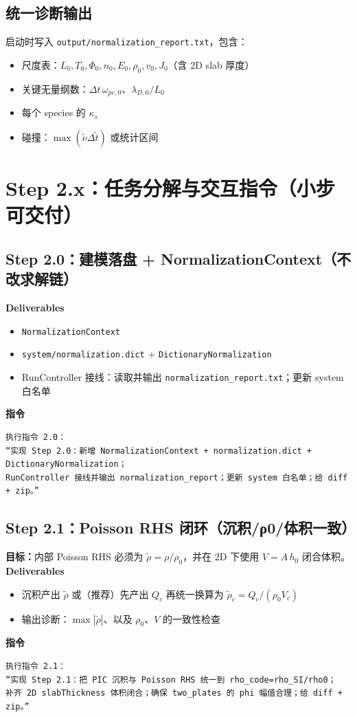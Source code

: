 \documentclass[11pt,a4paper]{ctexart}
\begin{document}
\subsection{统一诊断输出}
启动时写入 \texttt{output/normalization\_report.txt}，包含：
\begin{itemize}
\item 尺度表：$L_0,T_0,\Phi_0,n_0,E_0,\rho_0,v_0,J_0$（含 2D slab 厚度）
\item 关键无量纲数：$\Delta t\,\omega_{pe,0}$、$\lambda_{D,0}/L_0$
\item 每个 species 的 $\kappa_s$
\item 碰撞：$\max(\tilde{\nu}\Delta\tilde t)$ 或统计区间
\end{itemize}

\section{Step 2.x：任务分解与交互指令（小步可交付）}
\subsection{Step 2.0：建模落盘 + NormalizationContext（不改求解链）}
\textbf{Deliverables}
\begin{itemize}
\item \texttt{NormalizationContext}
\item \texttt{system/normalization.dict} + \texttt{DictionaryNormalization}
\item RunController 接线：读取并输出 \texttt{normalization\_report.txt}；更新 system 白名单
\end{itemize}
\textbf{指令}
\begin{verbatim}
执行指令 2.0：
“实现 Step 2.0：新增 NormalizationContext + normalization.dict + DictionaryNormalization；
RunController 接线并输出 normalization_report；更新 system 白名单；给 diff + zip。”
\end{verbatim}

\subsection{Step 2.1：Poisson RHS 闭环（沉积/ρ0/体积一致）}
\textbf{目标：}内部 Poisson RHS 必须为 $\tilde{\rho}=\rho/\rho_0$，并在 2D 下使用 $V=A\,h_0$ 闭合体积。
\textbf{Deliverables}
\begin{itemize}
\item 沉积产出 $\tilde{\rho}$ 或（推荐）先产出 $Q_c$ 再统一换算为 $\tilde{\rho}_c=Q_c/(\rho_0 V_c)$
\item 输出诊断：$\max|\tilde{\rho}|$、以及 $\rho_0$、$V$ 的一致性检查
\end{itemize}
\textbf{指令}
\begin{verbatim}
执行指令 2.1：
“实现 Step 2.1：把 PIC 沉积与 Poisson RHS 统一到 rho_code=rho_SI/rho0；
补齐 2D slabThickness 体积闭合；确保 two_plates 的 phi 幅值合理；给 diff + zip。”
\end{verbatim}
\end{document}
